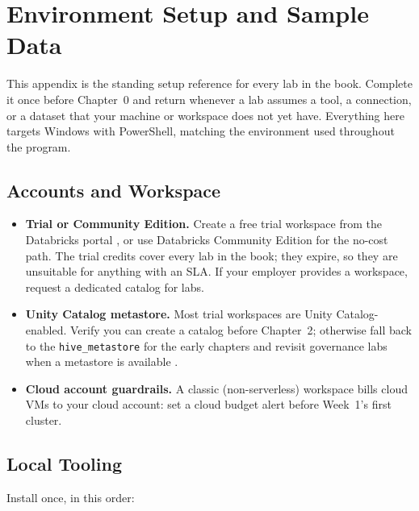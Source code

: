 \chapter{Environment Setup and Sample Data}
%
This appendix is the standing setup reference for every lab in the book. Complete it once
before Chapter~0 and return whenever a lab assumes a tool, a connection, or a dataset that
your machine or workspace does not yet have. Everything here targets Windows with PowerShell,
matching the environment used throughout the program.

\section{Accounts and Workspace}
%
\begin{itemize}
    \item \textbf{Trial or Community Edition.} Create a free trial workspace from the Databricks
    portal \cite{databricksTrial}, or use Databricks Community Edition for the no-cost path. The
    trial credits cover every lab in the book; they expire, so they are unsuitable for anything
    with an SLA. If your employer provides a workspace, request a dedicated catalog for labs.
    \item \textbf{Unity Catalog metastore.} Most trial workspaces are Unity Catalog-enabled. Verify
    you can create a catalog before Chapter~2; otherwise fall back to the \texttt{hive\_metastore}
    for the early chapters and revisit governance labs when a metastore is available
    \cite{databricksUnityCatalog}.
    \item \textbf{Cloud account guardrails.} A classic (non-serverless) workspace bills cloud VMs to
    your cloud account: set a cloud budget alert before Week~1's first cluster.
\end{itemize}

\section{Local Tooling}
%
Install once, in this order:

